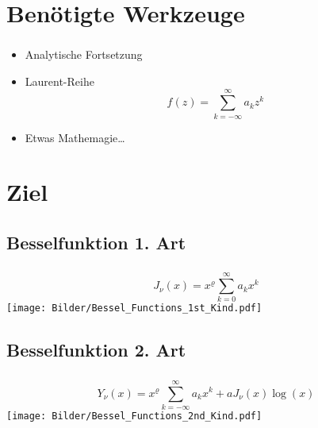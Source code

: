 \documentclass{beamer}
\newenvironment{slide}
{\begin{frame}[environment=slide]
	\frametitle{\insertsection}
	\framesubtitle{\insertsubsection}}
{\end{frame}}
\begin{document}
\section{Benötigte Werkzeuge}
	\begin{slide}
		\begin{itemize}
			\item Analytische Fortsetzung
			\item Laurent-Reihe $$f(z)=\sum_{k=-\infty}^{\infty}a_kz^k $$
			\item Etwas Mathemagie\ldots
		\end{itemize}
	\end{slide}
	
\section{Ziel}
\subsection{Besselfunktion 1. Art}
	\begin{slide}
		\centering
		$$J_\nu(x)=x^\varrho\sum_{k=0}^{\infty}a_kx^k$$
		\texttt{[image: Bilder/Bessel\_Functions\_1st\_Kind.pdf]}
	\end{slide}
\subsection{Besselfunktion 2. Art}
	\begin{slide}
		\centering
		$$Y_\nu(x)=x^\varrho\sum_{k=-\infty}^{\infty}a_kx^k+aJ_\nu(x)\log(x)$$
		\texttt{[image: Bilder/Bessel\_Functions\_2nd\_Kind.pdf]}
	\end{slide}
\end{document}
